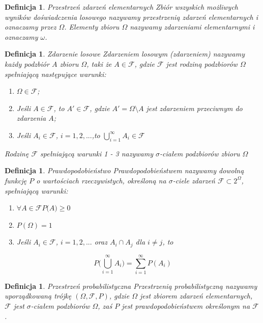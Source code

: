 \documentclass[12pt,a4paper]{report}
\newtheorem{definition}[theorem]{Definicja}
\begin{document}
\begin{definition}{Przestrzeń zdarzeń elementarnych \cite[w oparciu o rozdział 1.1]{krysicki1999}}
Zbiór wszyskich możliwych wyników doświadczenia losowego nazywamy przestrzenią zdarzeń elementarnych i oznaczamy przez $\Omega$. Elementy zbioru $\Omega$ nazywamy zdarzeniami elementarnymi i oznaczamy $\omega$.
\end{definition}

\begin{definition}{Zdarzenie losowe \cite[w oparciu o rozdział 1.1]{krysicki1999}}
Zdarzeniem losowym (zdarzeniem) nazywamy każdy podzbiór $\textit{A}$ zbioru $\Omega$, taki że  $A \in \mathcal{F}$, gdzie $\mathcal{F}$ jest rodziną podzbiorów $\Omega$ spełniającą następujące warunki:
\begin{enumerate}
\item $\Omega \in \mathcal{F}$;
\item Jeśli $A \in \mathcal{F}$, to $\textit{A$'$} \in \mathcal{F}$, gdzie $\textit{A$'$} = \Omega \setminus A $ jest zdarzeniem przeciwnym do zdarzenia $\textit{A}$;
\item Jeśli $\textit{A}_{i} \in \mathcal{F}$, $i= 1, 2, ...$,to $\bigcup\limits_{i=1}^{\infty} A_{i} \in \mathcal{F} $
\end{enumerate}
Rodzinę $\mathcal{F}$ spełniającą warunki 1 - 3 nazywamy $\sigma$-ciałem podzbiorów zbioru $\Omega$
\end{definition}


\begin{definition}{Prawdopodobieństwo \cite[w oparciu o rozdział 1.1]{krysicki1999}}
Prawdopodobieństwem nazywamy dowolną funkcję $P$ o wartościach rzeczywistych, określoną na $\sigma$-ciele zdarzeń $\mathcal{F} \subset 2^\Omega$, spełniającą warunki: 
\begin{enumerate}
\item $\forall{\textit{A} \in \mathcal{F}} \textit{P(A)} \geq 0 \quad $
\item $\textit{P}(\Omega) = 1$
\item Jeśli $\textit{A}_{i} \in \mathcal{F}$, $i= 1, 2, ...$ oraz $A_{i} \cap A_{j}$ dla $i \neq j$, to 
\end{enumerate}

$$P \Big(\bigcup\limits_{i=1}^{\infty} A_{i} \Big)=\sum_{i=1}^{\infty} P(A_{i}) $$

\end{definition}


\begin{definition}{Przestrzeń probabilistyczna \cite[w oparciu o rozdział 1.2]{krysicki1999}}
Przestrzenią probabilistyczną nazywamy uporządkowaną trójkę $(\Omega, \mathcal{F}, P)$, gdzie $\Omega$ jest zbiorem zdarzeń elementarnych, $\mathcal{F}$ jest $\sigma$-ciałem podzbiorów $\Omega$, zaś $P$ jest prawdopodobieństwem określonym na $\mathcal{F}$.
\end{definition}
\end{document}
